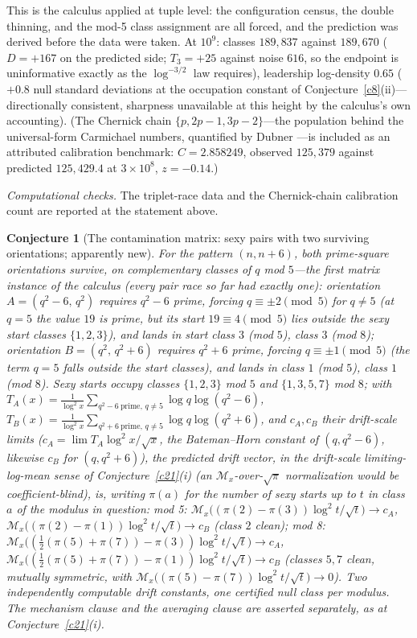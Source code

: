 \documentclass[11pt]{article}
\newtheorem{conjecture}{Conjecture}
\theoremstyle{definition}
\newcommand{\M}{\mathcal M}
\begin{document}
This is the calculus applied at tuple level: the
configuration census, the double thinning, and the mod-5 class
assignment are all forced, and the prediction was derived before the
data were taken.  At $10^9$: classes $189{,}837$ against $189{,}670$
($D=+167$ on the predicted side; $T_3=+25$ against noise $616$, so
the endpoint is uninformative exactly as the $\log^{-3/2}$ law
requires), leadership log-density $0.65$ ($+0.8$ null standard
deviations at the occupation constant of
Conjecture~\ref{c8}(ii)---directionally
consistent, sharpness unavailable at this height by the calculus's
own accounting).  (The Chernick chain
$\{p,2p-1,3p-2\}$---the population behind the universal-form
Carmichael numbers, quantified by Dubner \cite{Dubner2002}---is
included as an attributed calibration benchmark:
$C=2.858249$, observed $125{,}379$ against predicted $125{,}429.4$ at
$3\times10^8$, $z=-0.14$.)

\emph{Computational checks.}  The triplet-race data and the Chernick-chain
calibration count are reported at the statement above.

\setcounter{conjecture}{18}%
\begin{conjecture}[The contamination matrix: sexy pairs with two
surviving orientations; apparently new]\label{c7}
For the pattern $(n,n+6)$, \emph{both} prime-square orientations
survive, on complementary classes of $q$ mod $5$---the first matrix
instance of the calculus (every pair race so far had exactly one):
orientation $A=(q^2-6,\,q^2)$ requires $q^2-6$ prime, forcing
$q\equiv\pm2\pmod5$ for $q\neq5$ (at $q=5$ the value $19$ is prime,
but its start $19\equiv4\pmod5$ lies outside the sexy start classes
$\{1,2,3\}$), and lands in start class $3$ (mod $5$), class
$3$ (mod $8$); orientation $B=(q^2,\,q^2+6)$ requires $q^2+6$ prime,
forcing $q\equiv\pm1\pmod5$ (the term $q=5$ falls outside the start
classes), and lands in class $1$ (mod $5$), class $1$ (mod $8$).
Sexy starts occupy classes $\{1,2,3\}$ mod $5$ and $\{1,3,5,7\}$ mod
$8$; with
$T_{A}(x)=\frac1{\log^2x}\sum_{q^2-6\ \mathrm{prime},\,q\neq5}\log
q\log(q^2-6)$,
$T_{B}(x)=\frac1{\log^2x}\sum_{q^2+6\ \mathrm{prime},\,q\neq5}\log
q\log(q^2+6)$, and $c_A,c_B$ their drift-scale limits
($c_A=\lim T_A\log^2x/\sqrt x$, the Bateman--Horn constant of
$(q,q^2-6)$, likewise $c_B$ for $(q,q^2+6)$), the predicted drift
vector, in the drift-scale limiting-log-mean sense of
Conjecture~\ref{c21}(i) (an $\M_x$-over-$\sqrt\pi$ normalization would be coefficient-blind), is, writing $\pi(a)$ for the number of sexy starts up to $t$ in class $a$ of the modulus in question:
mod 5: $\M_x\bigl((\pi(2)-\pi(3))\log^2t/\sqrt t\bigr)\to c_A$,
$\M_x\bigl((\pi(2)-\pi(1))\log^2t/\sqrt t\bigr)\to c_B$ (class $2$
\emph{clean}); mod 8:
$\M_x\bigl((\tfrac12(\pi(5)+\pi(7))-\pi(3))\log^2t/\sqrt t\bigr)\to
c_A$,
$\M_x\bigl((\tfrac12(\pi(5)+\pi(7))-\pi(1))\log^2t/\sqrt t\bigr)\to
c_B$ (classes $5,7$ clean, mutually symmetric, with
$\M_x\bigl((\pi(5)-\pi(7))\log^2t/\sqrt t\bigr)\to0$).  Two
independently computable drift constants,
one certified null class per modulus.  The mechanism clause and the
averaging clause are asserted separately, as at
Conjecture~\ref{c21}(i).
\end{conjecture}
\end{document}
